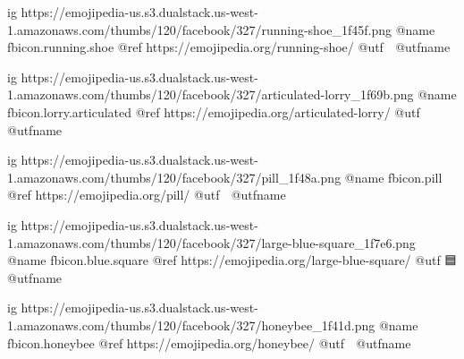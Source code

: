 	ig https://emojipedia-us.s3.dualstack.us-west-1.amazonaws.com/thumbs/120/facebook/327/running-shoe_1f45f.png
	@name fbicon.running.shoe
	@ref https://emojipedia.org/running-shoe/
	@utf 👟
	@utfname

	ig https://emojipedia-us.s3.dualstack.us-west-1.amazonaws.com/thumbs/120/facebook/327/articulated-lorry_1f69b.png
	@name fbicon.lorry.articulated
	@ref https://emojipedia.org/articulated-lorry/
	@utf 🚛
	@utfname

	ig https://emojipedia-us.s3.dualstack.us-west-1.amazonaws.com/thumbs/120/facebook/327/pill_1f48a.png
	@name fbicon.pill
	@ref https://emojipedia.org/pill/
	@utf 💊
	@utfname

	ig https://emojipedia-us.s3.dualstack.us-west-1.amazonaws.com/thumbs/120/facebook/327/large-blue-square_1f7e6.png
	@name fbicon.blue.square
	@ref https://emojipedia.org/large-blue-square/
	@utf 🟦
	@utfname

	ig https://emojipedia-us.s3.dualstack.us-west-1.amazonaws.com/thumbs/120/facebook/327/honeybee_1f41d.png
	@name fbicon.honeybee
	@ref https://emojipedia.org/honeybee/
	@utf 🐝
	@utfname


\fi

